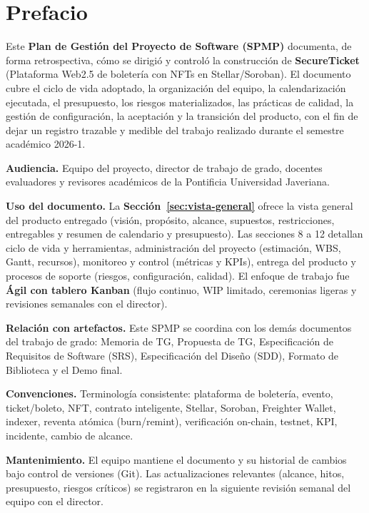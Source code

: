 \documentclass[12pt,oneside]{report}
\newcommand{\projectname}{SecureTicket}
\newcommand{\projectsubtitle}{Plataforma Web2.5 de boletería con NFTs en Stellar/Soroban}
\begin{document}
  \section*{Prefacio}
  Este \textbf{Plan de Gestión del Proyecto de Software (SPMP)} documenta, de forma retrospectiva, cómo se dirigió y controló la construcción de \textbf{\projectname} (\projectsubtitle). El documento cubre el ciclo de vida adoptado, la organización del equipo, la calendarización ejecutada, el presupuesto, los riesgos materializados, las prácticas de calidad, la gestión de configuración, la aceptación y la transición del producto, con el fin de dejar un registro trazable y medible del trabajo realizado durante el semestre académico 2026-1.

  \textbf{Audiencia.} Equipo del proyecto, director de trabajo de grado, docentes evaluadores y revisores académicos de la Pontificia Universidad Javeriana.

  \textbf{Uso del documento.} La \textbf{Sección~\ref{sec:vista-general}} ofrece la vista general del producto entregado (visión, propósito, alcance, supuestos, restricciones, entregables y resumen de calendario y presupuesto). Las secciones 8 a 12 detallan ciclo de vida y herramientas, administración del proyecto (estimación, WBS, Gantt, recursos), monitoreo y control (métricas y KPIs), entrega del producto y procesos de soporte (riesgos, configuración, calidad). El enfoque de trabajo fue \textbf{Ágil con tablero Kanban} (flujo continuo, WIP limitado, ceremonias ligeras y revisiones semanales con el director).

  \textbf{Relación con artefactos.} Este SPMP se coordina con los demás documentos del trabajo de grado: Memoria de TG, Propuesta de TG, Especificación de Requisitos de Software (SRS), Especificación del Diseño (SDD), Formato de Biblioteca y el Demo final.

  \textbf{Convenciones.} Terminología consistente: plataforma de boletería, evento, ticket/boleto, NFT, contrato inteligente, Stellar, Soroban, Freighter Wallet, indexer, reventa atómica (burn/remint), verificación on-chain, testnet, KPI, incidente, cambio de alcance.

  \textbf{Mantenimiento.} El equipo mantiene el documento y su historial de cambios bajo control de versiones (Git). Las actualizaciones relevantes (alcance, hitos, presupuesto, riesgos críticos) se registraron en la siguiente revisión semanal del equipo con el director.

  \tableofcontents
  \listoffigures
  \listoftables
  \clearpage
\end{document}
